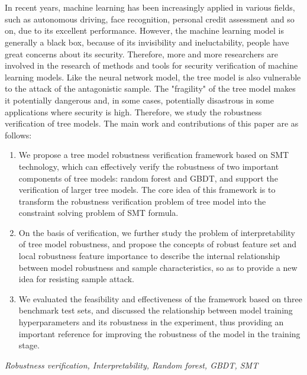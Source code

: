 \newpage
\vspace{-1cm}
\chapter*{}

In recent years, machine learning has been increasingly applied in various fields, such as autonomous driving, face recognition, personal credit assessment and so on, due to its excellent performance. However, the machine learning model is generally a black box, because of its invisibility and ineluctability, people have great concerns about its security. Therefore, more and more researchers are involved in the research of methods and tools for security verification of machine learning models.
Like the neural network model, the tree model is also vulnerable to the attack of the antagonistic sample. The "fragility" of the tree model makes it potentially dangerous and, in some cases, potentially disastrous in some applications where security is high. Therefore, we study the robustness verification of tree models. The main work and contributions of this paper are as follows:
\begin{enumerate}
	\item We propose a tree model robustness verification framework based on SMT technology, which can effectively verify the robustness of two important components of tree models: random forest and GBDT, and support the verification of larger tree models. The core idea of this framework is to transform the robustness verification problem of tree model into the constraint solving problem of SMT formula.
	\item On the basis of verification, we further study the problem of interpretability of tree model robustness, and propose the concepts of robust feature set and local robustness feature importance to describe the internal relationship between model robustness and sample characteristics, so as to provide a new idea for resisting sample attack.
	\item We evaluated the feasibility and effectiveness of the framework based on three benchmark test sets, and discussed the relationship between model training hyperparameters and its robustness in the experiment, thus providing an important reference for improving the robustness of the model in the training stage.
\end{enumerate}
{} \textit{Robustness verification, Interpretability, Random forest, GBDT, SMT}


